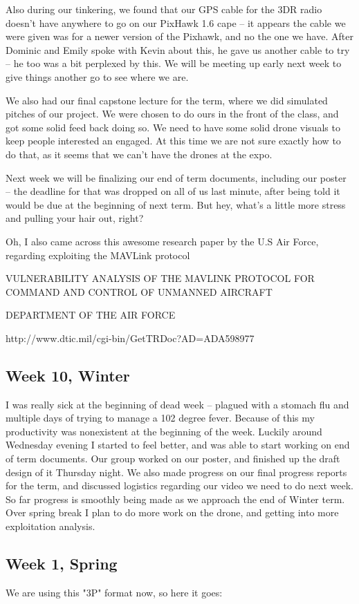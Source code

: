 Also during our tinkering, we found that our GPS cable for the 3DR radio doesn't have anywhere to go on our PixHawk 1.6 cape -- it appears the cable we were given was for a newer version of the Pixhawk, and no the one we have. After Dominic and Emily spoke with Kevin about this, he gave us another cable to try -- he too was a bit perplexed by this. We will be meeting up early next week to give things another go to see where we are.

We also had our final capstone lecture for the term, where we did simulated pitches of our project. We were chosen to do ours in the front of the class, and got some solid feed back doing so. We need to have some solid drone visuals to keep people interested an engaged. At this time we are not sure exactly how to do that, as it seems that we can't have the drones at the expo.

Next week we will be finalizing our end of term documents, including our poster -- the deadline for that was dropped on all of us last minute, after being told it would be due at the beginning of next term. But hey, what's a little more stress and pulling your hair out, right?

Oh, I also came across this awesome research paper by the U.S Air Force, regarding exploiting the MAVLink protocol

VULNERABILITY ANALYSIS OF THE MAVLINK PROTOCOL FOR COMMAND AND CONTROL OF UNMANNED AIRCRAFT

DEPARTMENT OF THE AIR FORCE

http://www.dtic.mil/cgi-bin/GetTRDoc?AD=ADA598977
\subsection{Week 10, Winter}
I was really sick at the beginning of dead week -- plagued with a stomach flu and multiple days of trying to manage a 102 degree fever. Because of this my productivity was nonexistent at the beginning of the week. Luckily around Wednesday evening I started to feel better, and was able to start working on end of term documents. Our group worked on our poster, and finished up the draft design of it Thursday night. We also made progress on our final progress reports for the term, and discussed logistics regarding our video we need to do next week. So far progress is smoothly being made as we approach the end of Winter term. Over spring break I plan to do more work on the drone, and getting into more exploitation analysis.
\subsection{Week 1, Spring}
We are using this "3P" format now, so here it goes:

